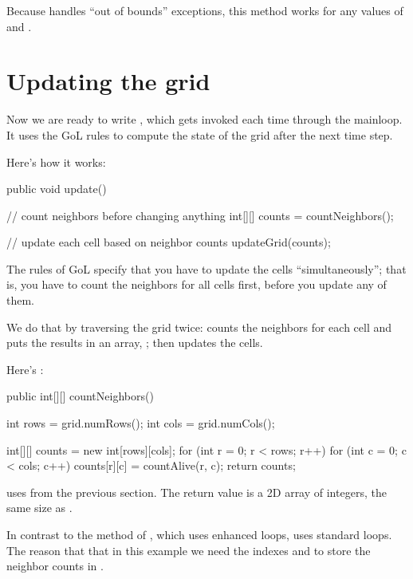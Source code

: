 Because  handles ``out of bounds'' exceptions, this method works for any values of  and .


\section{Updating the grid}
\label{sec:update}

Now we are ready to write , which gets invoked each time through the mainloop.
It uses the GoL rules to compute the state of the grid after the next time step.

Here's how it works:

\begin{code}
    public void update() {
		// count neighbors before changing anything
        int[][] counts = countNeighbors();

        // update each cell based on neighbor counts
        updateGrid(counts);
    }
\end{code}

The rules of GoL specify that you have to update the cells ``simultaneously''; that is, you have to count the neighbors for all cells first, before you update any of them.

We do that by traversing the grid twice:  counts the neighbors for each cell and puts the results in an array, ; then  updates the cells.

Here's :


\begin{code}
	public int[][] countNeighbors() {
		int rows = grid.numRows();
        int cols = grid.numCols();

        int[][] counts = new int[rows][cols];
        for (int r = 0; r < rows; r++) {
            for (int c = 0; c < cols; c++) {
                counts[r][c] = countAlive(r, c);
            }
        }
		return counts;
	}
\end{code}

 uses  from the previous section.
The return value is a 2D array of integers, the same size as .

In contrast to the  method of , which uses enhanced  loops,  uses standard  loops.
The reason that that in this example we need the indexes  and  to store the neighbor counts in .

